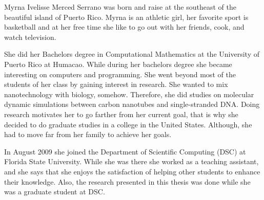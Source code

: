 \documentclass[11pt]{fsuthesis}
\begin{document}
%





\begin{biosketch}
Myrna Ivelisse Merced Serrano was born and raise at the southeast of the beautiful island of Puerto Rico. Myrna is an athletic girl, her favorite sport is basketball and at her free time she like to go out with her friends, cook, and watch television. 

She did her Bachelors degree in Computational Mathematics at the University of Puerto Rico at Humacao. While during her bachelors degree she became interesting on computers and programming. She went beyond most of the students of her class by gaining interest in research. She wanted to mix nanotechnology with biology, somehow. Therefore, she did studies on molecular dynamic simulations between carbon nanotubes and single-stranded DNA. Doing research motivates her to go farther from her current goal, that is why she decided to do graduate studies in a college in the United States. Although, she had to move far from her family to achieve her goals.

In August 2009 she joined the Department of Scientific Computing (DSC) at Florida State University. While she was there she worked as a teaching assistant, and she says that she enjoys the satisfaction of helping other students to enhance their knowledge. Also, the research presented in this thesis was done while she was a graduate student at DSC.
\end{biosketch}
\end{document}
